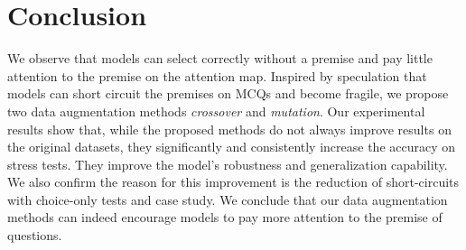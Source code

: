 \section{Conclusion}

We observe that models can select correctly without a premise and 
pay little attention to the premise on the attention map. 
Inspired by speculation that 
models can short circuit the premises on MCQs and become fragile, 
we propose two data augmentation methods 
\textit{crossover} and \textit{mutation}. 
Our experimental results show that, while the
proposed methods do not always improve
results on the original datasets,
they significantly and consistently increase the
accuracy on stress tests. 
They improve the model's robustness and generalization capability. 
We also confirm the reason for this improvement is the reduction 
of short-circuits with choice-only tests and case study.
We conclude that our data augmentation methods can 
indeed encourage models to pay more 
attention to the premise of questions. 

